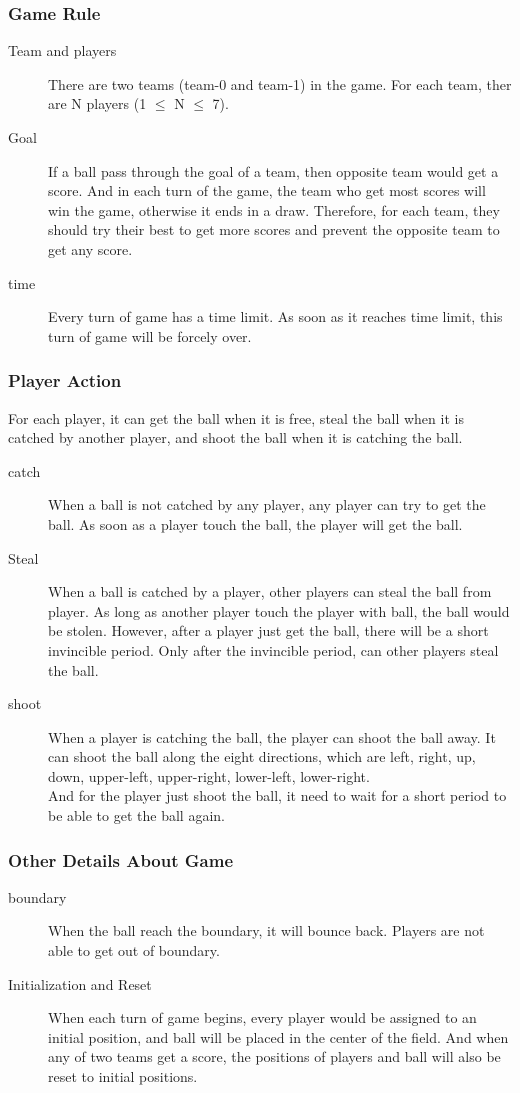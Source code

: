\documentclass[14pt]{extarticle}
\begin{document}
\subsubsection{Game Rule}
\begin{description}
	\item[Team and players]
	There are two teams (team-0 and team-1) in the game. For each team, ther are N players (1 $\leq$ N $\leq$ 7).
	\item[Goal]
	If a ball pass through the goal of a team, then opposite team would get a score. And in each turn of the game, the team who get most scores will win the game, otherwise it ends in a draw. Therefore, for each team, they should try their best to get more scores and prevent the opposite team to get any score.
	\item[time]
	Every turn of game has a time limit. As soon as it reaches time limit, this turn of game will be forcely over.
\end{description}

\subsubsection{Player Action}
For each player, it can get the ball when it is free, steal the ball when it is catched by another player, and shoot the ball when it is catching the ball.
\begin{description}
	\item[catch]
	When a ball is not catched by any player, any player can try to get the ball. As soon as a player touch the ball, the player will get the ball.
	\item[Steal]
	When a ball is catched by a player, other players can steal the ball from player. As long as another player touch the player with ball, the ball would be stolen. However, after a player just get the ball, there will be a short invincible period. Only after the invincible period, can other players steal the ball.
	\item[shoot]
	When a player is catching the ball, the player can shoot the ball away. It can shoot the ball along the eight directions, which are left, right, up, down, upper-left, upper-right, lower-left, lower-right.\\
	And for the player just shoot the ball, it need to wait for a short period to be able to get the ball again.
\end{description}

\subsubsection{Other Details About Game}
\begin{description}
	\item[boundary]
	When the ball reach the boundary, it will bounce back. Players are not able to get out of boundary.
	\item[Initialization and Reset]
	When each turn of game begins, every player would be assigned to an initial position, and ball will be placed in the center of the field. And when any of two teams get a score, the positions of players and ball will also be reset to initial positions.
\end{description}
\end{document}
